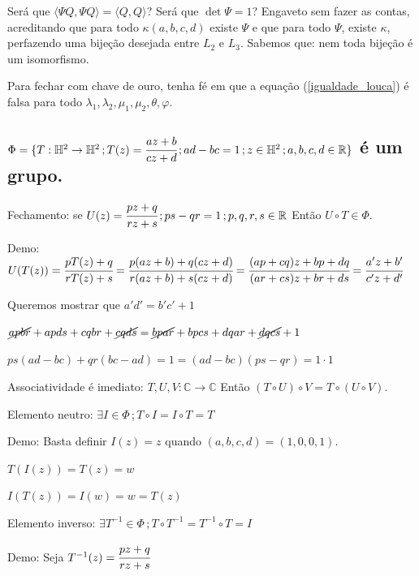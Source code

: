 \documentclass[10pt,a4paper]{article}
\begin{document}
		Ser\'a que $\langle \Psi Q, \Psi Q \rangle = \langle Q, Q \rangle$? Ser\'a que $\det \Psi = 1$? Engaveto sem fazer as contas, acreditando que para todo $\kappa(a,b,c,d)$ existe $\Psi$ e que para todo $\Psi$, existe $\kappa$, perfazendo uma bije\c{c}\~ao desejada entre $L_2$ e $L_3$. Sabemos que: nem toda bije\c{c}\~ao \'e um isomorfismo.

		Para fechar com chave de ouro, tenha f\'e em que a equa\c{c}\~ao (\ref{igualdade_louca}) \'e falsa para todo $\lambda_1, \lambda_2, \mu_1, \mu_2, \theta, \varphi$.

		\vspace{120mm}

		\subsection{$\Phi = \{ T : \mathbb{H}^2 \rightarrow \mathbb{H}^2 \,; T(z) = \cfrac{az + b}{cz + d} \,; ad - bc = 1 \,; z \in \mathbb{H}^2 \,; a,b,c,d \in \mathbb{R} \}$ \'e um grupo.}
		\begin{flushright}
		\end{flushright}

		Fechamento: se $U(z) = \cfrac{pz + q}{rz + s} \,; ps - qr = 1 \,; p,q,r,s \in \mathbb{R}$ Ent\~ao $U \circ T \in \Phi$.

		Demo: $U(T(z)) = \cfrac{pT(z) + q}{rT(z) + s} = \cfrac{p(az + b) + q(cz + d)}{r(az + b) + s(cz + d)} = \cfrac{(ap + cq) z + bp + dq}{(ar + cs)z + br + ds} = \cfrac{a'z + b'}{c'z + d'} $

		Queremos mostrar que $a'd' = b'c' + 1$

		$\cancel{apbr} + apds + cqbr + \cancel{cqds} = \cancel{bpar} + bpcs + dqar + \cancel{dqcs} + 1$

		$ps(ad - bc) + qr(bc - ad) = 1 = (ad - bc)(ps - qr) = 1 \cdot 1$

		Associatividade \'e imediato: $T,U,V : \mathbb{C} \rightarrow \mathbb{C}$ Ent\~ao $(T \circ U) \circ V = T \circ (U \circ V)$.

		Elemento neutro: $\exists I \in \Phi \,; T \circ I = I \circ T = T$

		Demo: Basta definir $I(z) = z$ quando $(a,b,c,d) = (1,0,0,1)$.

		$T(I(z)) = T(z) = w$

		$I(T(z)) = I(w) = w = T(z)$

		Elemento inverso: $\exists T^{-1} \in \Phi \,; T \circ T^{-1} = T^{-1} \circ T = I$

		Demo: Seja $T^{-1}(z) = \cfrac{pz + q}{rz + s}$
\end{document}

